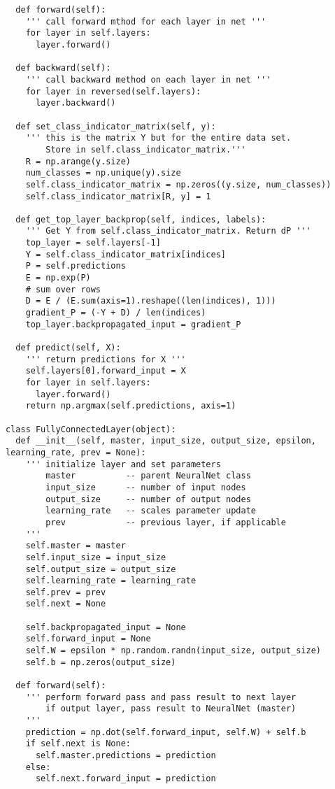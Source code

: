 \begin{verbatim}
  def forward(self):
    ''' call forward mthod for each layer in net '''
    for layer in self.layers:
      layer.forward()

  def backward(self):
    ''' call backward method on each layer in net '''
    for layer in reversed(self.layers):
      layer.backward()
    
  def set_class_indicator_matrix(self, y):
    ''' this is the matrix Y but for the entire data set.
        Store in self.class_indicator_matrix.'''
    R = np.arange(y.size)
    num_classes = np.unique(y).size
    self.class_indicator_matrix = np.zeros((y.size, num_classes))
    self.class_indicator_matrix[R, y] = 1
    
  def get_top_layer_backprop(self, indices, labels):
    ''' Get Y from self.class_indicator_matrix. Return dP '''
    top_layer = self.layers[-1]
    Y = self.class_indicator_matrix[indices]
    P = self.predictions
    E = np.exp(P)
    # sum over rows
    D = E / (E.sum(axis=1).reshape((len(indices), 1)))
    gradient_P = (-Y + D) / len(indices)
    top_layer.backpropagated_input = gradient_P

  def predict(self, X):
    ''' return predictions for X '''
    self.layers[0].forward_input = X
    for layer in self.layers:
      layer.forward()
    return np.argmax(self.predictions, axis=1)

class FullyConnectedLayer(object):
  def __init__(self, master, input_size, output_size, epsilon, learning_rate, prev = None):
    ''' initialize layer and set parameters
        master          -- parent NeuralNet class
        input_size      -- number of input nodes
        output_size     -- number of output nodes
        learning_rate   -- scales parameter update
        prev            -- previous layer, if applicable
    '''
    self.master = master
    self.input_size = input_size
    self.output_size = output_size
    self.learning_rate = learning_rate
    self.prev = prev
    self.next = None

    self.backpropagated_input = None
    self.forward_input = None
    self.W = epsilon * np.random.randn(input_size, output_size)
    self.b = np.zeros(output_size)

  def forward(self):
    ''' perform forward pass and pass result to next layer
        if output layer, pass result to NeuralNet (master)
    '''
    prediction = np.dot(self.forward_input, self.W) + self.b
    if self.next is None:
      self.master.predictions = prediction
    else:
      self.next.forward_input = prediction
    

\end{verbatim}
